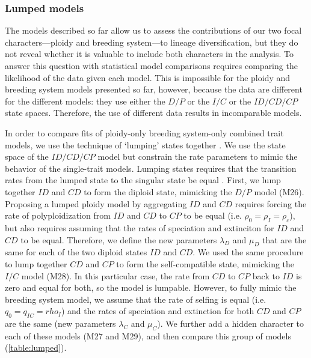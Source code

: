 \subsubsection{Lumped models}

The models described so far allow us to assess the contributions of our two focal characters---ploidy and breeding system---to lineage diversification, but they do not reveal whether it is valuable to include both characters in the analysis.
To answer this question with statistical model comparisons requires comparing the likelihood of the data given each model.
This is impossible for the ploidy and breeding system models presented so far, however, because the data are different for the different models: they use either the $D/P$ or the $I/C$ or the $ID/CD/CP$ state spaces.
Therefore, the use of different data results in incomparable models.

In order to compare fits of ploidy-only \vs breeding system-only \vs combined trait models, we use the technique of `lumping' states together \citep{tarasov_2019}.
We use the state space of the $ID/CD/CP$ model but constrain the rate parameters to mimic the behavior of the single-trait models.
Lumping states requires that the transition rates from the lumped state to the singular state be equal \citep{tarasov_2019}.
First, we lump together $ID$ and $CD$ to form the diploid state, mimicking the $D/P$ model (M26). 
Proposing a lumped ploidy model by aggregating $ID$ and $CD$ requires forcing the rate of polyploidization from $ID$ and $CD$ to $CP$ to be equal (i.e. $\rho_0=\rho_I=\rho_c$), but also requires
assuming that the rates of speciation and extinciton for $ID$ and $CD$ to be equal.
Therefore, we define the new parameters $\lambda_D$ and $\mu_D$  that are the same for each of the two diploid states $ID$ and $CD$. %
We used the same procedure to lump together $CD$ and $CP$ to form the self-compatible state, mimicking the $I/C$ model (M28).
In this particular case, the rate from $CD$ to $CP$ back to $ID$ is zero and equal for both, so the model is lumpable. 
However, to fully mimic the breeding system model, we assume that the rate of selfing is equal (i.e. $q_0=q_{IC}=rho_I$) and the rates of speciation and extinction for both $CD$ and $CP$ are the same (new parameters $\lambda_C$ and $\mu_C$).
We further add a hidden character to each of these models (M27 and M29), and then compare this group of models (\cref{table:lumped}).

